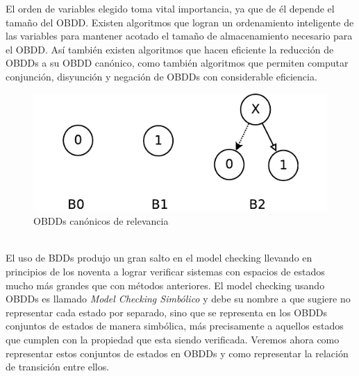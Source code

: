 \documentclass[titlepage, 12pt]{book}
\begin{document}
El orden de variables elegido toma vital importancia, ya que de \'el depende el tama\~no del OBDD. Existen algoritmos que logran un ordenamiento inteligente de las variables para mantener acotado el tama\~no de almacenamiento necesario para el OBDD. As\'i tambi\'en existen algoritmos que hacen eficiente la reducci\'on de OBDDs a su OBDD can\'onico, como tambi\'en algoritmos que permiten computar conjunci\'on, disyunci\'on y negaci\'on de OBDDs con considerable eficiencia.\\


\begin{figure}[htp]
  \centering
    \includegraphics{Imagenes/canonicos.pdf}
  \caption{OBDDs can\'onicos de relevancia}
  \label{canonicos}
\end{figure}
~\\


El uso de BDDs produjo un gran salto en el model checking llevando en principios de los noventa a lograr verificar sistemas con espacios de estados mucho m\'as grandes que con m\'etodos anteriores. El model checking usando OBDDs es llamado \textit{Model Checking Simb\'olico} y debe su nombre a que sugiere no representar cada estado por separado, sino que se representa en los OBDDs conjuntos de estados de manera simb\'olica, m\'as precisamente a aquellos estados que cumplen con la propiedad que esta siendo verificada. Veremos ahora como representar estos conjuntos de estados en OBDDs y como representar la relaci\'on de transici\'on entre ellos.\\
\end{document}
